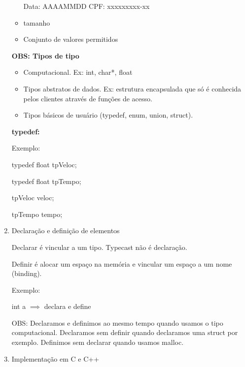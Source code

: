\documentclass[
	12pt, %
]{fphw}
\begin{document}
\begin{doublespace}
\begin{enumerate}
\begin{itemize}
                        Data: AAAAMMDD
                        CPF: xxxxxxxxx-xx

                  \item tamanho
                  \item Conjunto de valores permitidos

              \end{itemize}

              \textbf{OBS: Tipos de tipo}

              \begin{itemize}

                  \item Computacional. Ex: int, char*, float
                  \item Tipos abstratos de dados. Ex: estrutura encapsulada que só é conhecida pelos clientes através de funções de acesso.
                  \item Tipos básicos de usuário (typedef, enum, union, struct).

              \end{itemize}

              \textbf{typedef:}

              Exemplo:

              typedef float tpVeloc;

              typedef float tpTempo;

              tpVeloc veloc;

              tpTempo tempo;

        \item Declaração e definição de elementos

              Declarar é vincular a um tipo. Typecast não é declaração.

              Definir é alocar um espaço na memória e vincular um espaço a um nome (binding).

              Exemplo:

              int a $\implies$ declara e define

              OBS: Declaramos e definimos ao mesmo tempo quando usamos o tipo computacional. Declaramos sem definir quando declaramos uma struct por exemplo. Definimos sem declarar quando usamos malloc.

        \item Implementação em C e C++

              \begin{enumerate}


\end{enumerate}
\end{enumerate}
\end{doublespace}
\end{document}
